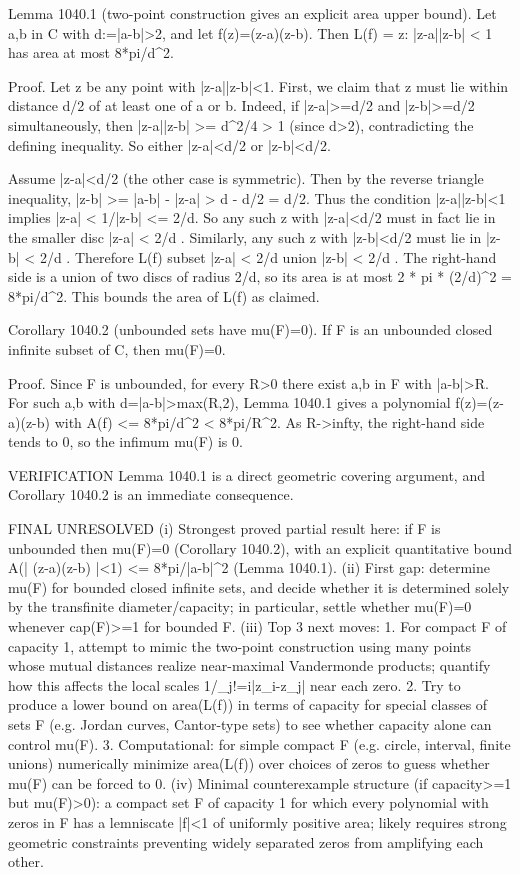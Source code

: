 Lemma 1040.1 (two-point construction gives an explicit area upper bound).
Let a,b in C with d:=|a-b|>2, and let f(z)=(z-a)(z-b).
Then
  L(f) = { z: |z-a||z-b| < 1 }
has area at most 8*pi/d^2.

Proof.
Let z be any point with |z-a||z-b|<1.
First, we claim that z must lie within distance d/2 of at least one of a or b.
Indeed, if |z-a|>=d/2 and |z-b|>=d/2 simultaneously, then |z-a||z-b| >= d^2/4 > 1 (since d>2), contradicting the defining inequality.
So either |z-a|<d/2 or |z-b|<d/2.

Assume |z-a|<d/2 (the other case is symmetric). Then by the reverse triangle inequality,
  |z-b| >= |a-b| - |z-a| > d - d/2 = d/2.
Thus the condition |z-a||z-b|<1 implies
  |z-a| < 1/|z-b| <= 2/d.
So any such z with |z-a|<d/2 must in fact lie in the smaller disc { |z-a| < 2/d }.
Similarly, any such z with |z-b|<d/2 must lie in { |z-b| < 2/d }.
Therefore
  L(f) subset { |z-a| < 2/d } union { |z-b| < 2/d }.
The right-hand side is a union of two discs of radius 2/d, so its area is at most
  2 * pi * (2/d)^2 = 8*pi/d^2.
This bounds the area of L(f) as claimed.

Corollary 1040.2 (unbounded sets have mu(F)=0).
If F is an unbounded closed infinite subset of C, then mu(F)=0.

Proof.
Since F is unbounded, for every R>0 there exist a,b in F with |a-b|>R.
For such a,b with d=|a-b|>max(R,2), Lemma 1040.1 gives a polynomial f(z)=(z-a)(z-b) with
  A(f) <= 8*pi/d^2 < 8*pi/R^2.
As R->infty, the right-hand side tends to 0, so the infimum mu(F) is 0.

VERIFICATION
Lemma 1040.1 is a direct geometric covering argument, and Corollary 1040.2 is an immediate consequence.

FINAL
UNRESOLVED
(i) Strongest proved partial result here: if F is unbounded then mu(F)=0 (Corollary 1040.2), with an explicit quantitative bound A({| (z-a)(z-b) |<1}) <= 8*pi/|a-b|^2 (Lemma 1040.1).
(ii) First gap: determine mu(F) for bounded closed infinite sets, and decide whether it is determined solely by the transfinite diameter/capacity; in particular, settle whether mu(F)=0 whenever cap(F)>=1 for bounded F.
(iii) Top 3 next moves:
  1. For compact F of capacity 1, attempt to mimic the two-point construction using many points whose mutual distances realize near-maximal Vandermonde products; quantify how this affects the local scales 1/\prod_{j!=i}|z_i-z_j| near each zero.
  2. Try to produce a lower bound on area(L(f)) in terms of capacity for special classes of sets F (e.g. Jordan curves, Cantor-type sets) to see whether capacity alone can control mu(F).
  3. Computational: for simple compact F (e.g. circle, interval, finite unions) numerically minimize area(L(f)) over choices of zeros to guess whether mu(F) can be forced to 0.
(iv) Minimal counterexample structure (if capacity>=1 but mu(F)>0): a compact set F of capacity 1 for which every polynomial with zeros in F has a lemniscate |f|<1 of uniformly positive area; likely requires strong geometric constraints preventing widely separated zeros from amplifying each other.


